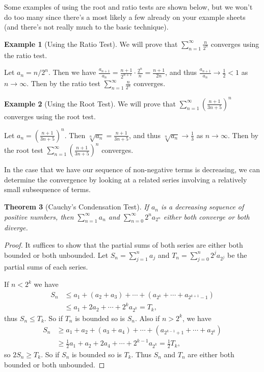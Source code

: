 \documentclass[11pt, a4paper]{article}
\newtheorem{theorem}{Theorem}[section]
\theoremstyle{definition}
\newtheorem{example}[theorem]{Example}
\begin{document}
Some examples of using the root and ratio tests are shown below, but we won't do too many since there's a most likely a few already on your example sheets (and there's not really much to the basic technique).

\begin{example}[Using the Ratio Test]
	We will prove that $\sum_{n = 1}^{\infty} \frac{n}{2^n}$ converges using the ratio test.

	Let $a_n = n/2^n$. Then we have $\frac{a_{n + 1}}{a_n} = \frac{n + 1}{2^{n + 1}} \cdot \frac{2^n}{n} = \frac{n + 1}{2n}$, and thus $\frac{a_{n + 1}}{a_n} \rightarrow \frac{1}{2} < 1$ as $n \rightarrow \infty$. Then by the ratio test $\sum_{n = 1}^{\infty} \frac{n}{2^n}$ converges.
\end{example}

\begin{example}[Using the Root Test]
	We will prove that $\sum_{n = 1}^{\infty} \left(\frac{n + 1}{3n + 5}\right)^n$ converges using the root test.

	Let $a_n = (\frac{n + 1}{3n + 5})^n$. Then $\sqrt[n]{a_n} = \frac{n + 1}{3n + 5}$, and thus $\sqrt[n]{a_n} \rightarrow \frac{1}{3}$ as $n \rightarrow \infty$. Then by the root test $\sum_{n = 1}^{\infty} \left(\frac{n + 1}{3n + 5}\right)^n$ converges.
\end{example}

In the case that we have our sequence of non-negative terms is decreasing, we can determine the convergence by looking at a related series involving a relatively small subsequence of terms.

\begin{theorem}[Cauchy's Condensation Test]
	If $a_n$ is a decreasing sequence of positive numbers, then $\sum_{n = 1}^{\infty} a_n$ and $\sum_{n = 0}^{\infty} 2^n a_{2^n}$ either both converge or both diverge.
\end{theorem}
\begin{proof}
It suffices to show that the partial sums of both series are either both bounded or both unbounded.
Let $S_n = \sum_{j = 1}^{n} a_j$ and $T_n = \sum_{j = 0}^n 2^j a_{2^j}$ be the partial sums of each series.

If $n < 2^k$ we have
\begin{align*}
	S_n &\leq a_1 + (a_2 + a_3) + \cdots + (a_{2^k} + \cdots + a_{2^{k + 1} - 1}) \\
	&\leq a_1 + 2 a_2 + \cdots + 2^k a_{2^k} = T_k,
\end{align*}
thus $S_n \leq T_k$. So if $T_n$ is bounded so is $S_n$. Also if $n > 2^k$, we have
\begin{align*}
	S_n &\geq a_1 + a_2 + (a_3 + a_4) + \cdots + (a_{2^{k -1}+1} + \cdots + a_{2^k}) \\
	&\geq \frac{1}{2}a_1 + a_2 + 2 a_4 + \cdots + 2^{k - 1}a_{2^k} = \frac{1}{2}T_k,
\end{align*}
so $2S_n \geq T_k$. So if $S_n$ is bounded so is $T_k$.
Thus $S_n$ and $T_n$ are either both bounded or both unbounded. 
\end{proof}
\end{document}
